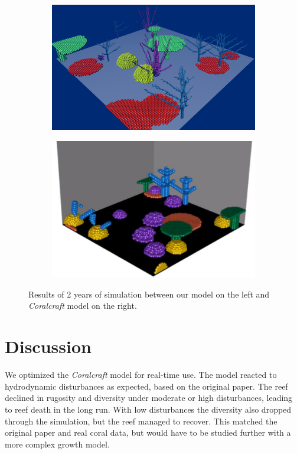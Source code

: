 \documentclass[9pt]{pnas-new}
\begin{document}
\begin{figure}[H]
    \centering
    \begin{subfigure}{0.35\textwidth}
        \includegraphics[width=\textwidth]{fig/my_result.png}
    \end{subfigure}
    \begin{subfigure}{0.35\textwidth}
        \includegraphics[width=\textwidth]{fig/Coralcraft.png}
    \end{subfigure}
    \caption{Results of 2 years of simulation between our model on the left and \textit{Coralcraft} model on the right.}
    \label{fig:compare}
\end{figure}

\section*{Discussion}

We optimized the \textit{Coralcraft} model for real-time use. The model reacted to hydrodynamic disturbances as expected, based on the original paper. The reef declined in rugosity and diversity under moderate or high disturbances, leading to reef death in the long run. With low disturbances the diversity also dropped through the simulation, but the reef managed to recover. This matched the original paper and real coral data, but would have to be studied further with a more complex growth model.
\end{document}
